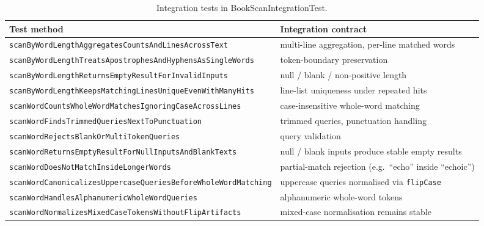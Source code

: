 \documentclass[journal]{IEEEtran}
\begin{document}
\begin{table}[!t]
\renewcommand{\arraystretch}{1.15}
\caption{Integration tests in BookScanIntegrationTest.}
\label{tab:int-tests}
\centering
\footnotesize
\begin{tabular}{@{}p{3.3cm}p{4.3cm}@{}}
\toprule
\textbf{Test method} & \textbf{Integration contract} \\
\midrule
\texttt{scanByWordLengthAggregates}\-\texttt{CountsAndLinesAcrossText} & multi-line aggregation, per-line matched words \\
\texttt{scanByWordLengthTreats}\-\texttt{ApostrophesAndHyphensAs}\-\texttt{SingleWords} & token-boundary preservation \\
\texttt{scanByWordLengthReturns}\-\texttt{EmptyResultForInvalidInputs} & null / blank / non-positive length \\
\texttt{scanByWordLengthKeeps}\-\texttt{MatchingLinesUniqueEvenWith}\-\texttt{ManyHits} & line-list uniqueness under repeated hits \\
\texttt{scanWordCountsWholeWord}\-\texttt{MatchesIgnoringCaseAcrossLines} & case-insensitive whole-word matching \\
\texttt{scanWordFindsTrimmed}\-\texttt{QueriesNextToPunctuation} & trimmed queries, punctuation handling \\
\texttt{scanWordRejectsBlankOr}\-\texttt{MultiTokenQueries} & query validation \\
\texttt{scanWordReturnsEmpty}\-\texttt{ResultForNullInputsAnd}\-\texttt{BlankTexts} & null / blank inputs produce stable empty results \\
\texttt{scanWordDoesNotMatch}\-\texttt{InsideLongerWords} & partial-match rejection (e.g.\ ``echo'' inside ``echoic'') \\
\texttt{scanWordCanonicalizes}\-\texttt{UppercaseQueriesBefore}\-\texttt{WholeWordMatching} & uppercase queries normalised via \texttt{flipCase} \\
\texttt{scanWordHandlesAlphanumeric}\-\texttt{WholeWordQueries} & alphanumeric whole-word tokens \\
\texttt{scanWordNormalizesMixed}\-\texttt{CaseTokensWithoutFlipArtifacts} & mixed-case normalisation remains stable \\
\bottomrule
\end{tabular}
\end{table}
\end{document}

